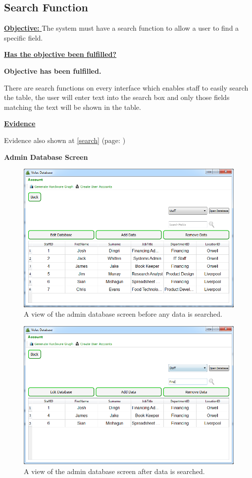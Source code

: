 \subsection{Search Function}

\underline{\textbf{Objective:} } The system must have a search function to allow a user to find a specific field.

\underline{\textbf{Has the objective been fulfilled?}}

\textbf{Objective has been fulfilled.}

There are search functions on every interface which enables staff to easily search the table, the user will enter text into the search box and only those fields matching the text will be shown in the table.

\underline{\textbf{Evidence}}

Evidence also shown at \ref{search} (page: \pageref{search})

\textbf{Admin Database Screen}

\begin{figure}[H]
    \includegraphics[width=\textwidth]{./Evaluation/Images/beforeadminsearch.png}
    \caption{A view of the admin database screen before any data is searched.} 
\end{figure}

\begin{figure}[H]
    \includegraphics[width=\textwidth]{./Evaluation/Images/afteradminsearch.png}
    \caption{A view of the admin database screen after data is searched.} 
\end{figure}

